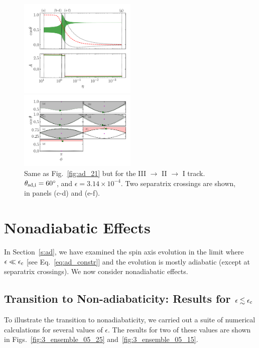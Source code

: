 \documentclass[
        fleqn,
        usenatbib,
    ]{mnras}
\begin{document}
\begin{figure}
    \centering
    \includegraphics[width=0.5\textwidth]{plots_diskdisp/3testo321.png}

    \includegraphics[width=0.5\textwidth]{plots_diskdisp/3testo321_subplots.png}
    \caption{Same as Fig.~\ref{fig:ad_21} but for the III $\to$ II $\to$ I
    track. $\theta_{\rm sd, i} = 60^\circ$, and $\epsilon = 3.14 \times
    10^{-4}$. Two separatrix crossings are shown, in panels (c-d) and
    (e-f).}\label{fig:ad_321}
\end{figure}


\section{Nonadiabatic Effects}\label{s:nonad}

In Section~\ref{s:ad}, we have examined the spin axis evolution in the limit
where $\epsilon \ll \epsilon_{\rm c}$ [see Eq.~\eqref{eq:ad_constr}] and the
evolution is mostly adiabatic (except at separatrix crossings). We now consider
nonadiabatic effects.

\subsection{Transition to Non-adiabaticity: Results for $\epsilon\lesssim
\epsilon_{\rm c}$}\label{ss:transition}

To illustrate the transition to nonadiabaticity, we carried out a suite of
numerical calculations for several values of $\epsilon$. The results for two of these
values are shown in Figs.~\ref{fig:3_ensemble_05_25}
and~\ref{fig:3_ensemble_05_15}.
\end{document}
